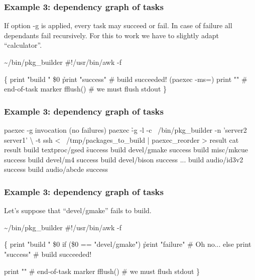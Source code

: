 \documentclass[hyperref={colorlinks=true}]{beamer}
\begin{document}
\begin{frame}[fragile]
  \frametitle{Example 3: dependency graph of tasks}
If option -g is applied, every task may succeed or fail. In case of failure
all dependants fail recursively.
For this to work we have to slightly adapt ``calculator''.
  \begin{block}{}
      \begin{CodeSmall}{\~{}/bin/pkg\_builder}
#!/usr/bin/awk -f

\{
   print "build " \$0
   \h{print "success"} # build succeeded! (paexec -ms=)
   print ""        # end-of-task marker
   fflush()        # we must flush stdout
\}
      \end{CodeSmall}
  \end{block}
\end{frame}

\begin{frame}[fragile]
  \frametitle{Example 3: dependency graph of tasks}

  \begin{block}{}
      \begin{CodeSmall}{paexec -g invocation (no failures)}
\prompt{\$} paexec \h{-g} -l -c ~/bin/pkg_builder -n 'server2 server1' \textbackslash
    -t ssh < ~/tmp/packages_to_build | paexec_reorder > result
\prompt{\$} cat result
build textproc/gsed
\h{success}
build devel/gmake
success
build misc/mkcue
success
build devel/m4
success
build devel/bison
success
...
build audio/id3v2
success
build audio/abcde
success
\prompt{\$}
      \end{CodeSmall}
  \end{block}
\end{frame}

\begin{frame}[fragile]
  \frametitle{Example 3: dependency graph of tasks}
Let's suppose that ``devel/gmake'' fails to build.

  \begin{block}{}
      \begin{CodeSmall}{\~{}/bin/pkg\_builder}
#!/usr/bin/awk -f

\{
   print "build " \$0
   if (\$0 == "devel/gmake")
      \h{print "failure"} # Oh no...
   else
      print "success" # build succeeded!

   print ""        # end-of-task marker
   fflush()        # we must flush stdout
\}
      \end{CodeSmall}
  \end{block}
\end{frame}
\end{document}
